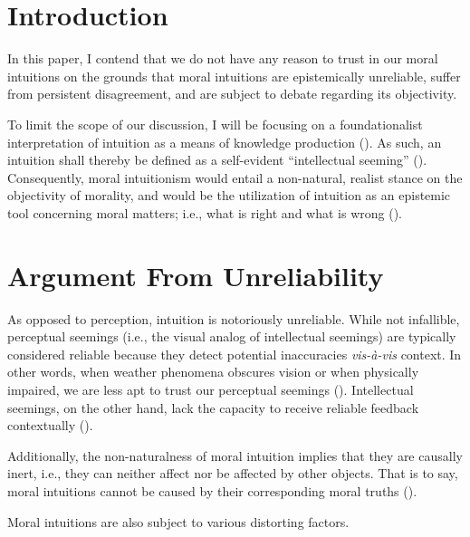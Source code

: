 

\section{Introduction}

In this paper, I contend that we do not have any reason to trust in our moral intuitions on the grounds that moral intuitions are epistemically unreliable, suffer from persistent disagreement, and are subject to debate regarding its objectivity. 

To limit the scope of our discussion, I will be focusing on a foundationalist interpretation of intuition as a means of knowledge production (\cite{britannica2024intuition}). As such, an intuition shall thereby be defined as a self-evident “intellectual seeming” (\cites{audi1999self}[p.\ 10]{bealer1998intuition}[p.\ 102]{huemer2005ethical}[p.\ 1]{ogar2016critique}). Consequently, moral intuitionism would entail a non-natural, realist stance on the objectivity of morality, and would be the utilization of intuition as an epistemic tool concerning moral matters; i.e., what is right and what is wrong (\cites{ethics2024moral}{stratton2014intuitionism}).  

\section{Argument From Unreliability}

As opposed to perception, intuition is notoriously unreliable. While not infallible, perceptual seemings (i.e., the visual analog of intellectual seemings) are typically considered reliable because they detect potential inaccuracies \emph{vis-à-vis} context. In other words, when weather phenomena obscures vision or when physically impaired, we are less apt to trust our perceptual seemings (\cite[p.\ 8]{cecchini2024reliability}). Intellectual seemings, on the other hand, lack the capacity to receive reliable feedback contextually (\cite[pp.\ 17–18]{destefano2014reliability}).

Additionally, the non-naturalness of moral intuition implies that they are causally inert, i.e., they can neither affect nor be affected by other objects. That is to say, moral intuitions cannot be caused by their corresponding moral truths (\cites[p.\ 1]{hayward2019immoral}{stratton2014intuitionism}).

Moral intuitions are also subject to various distorting factors.  

